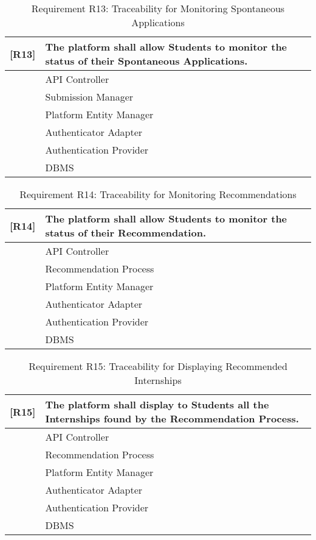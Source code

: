 \begin{table}[H]
    \centering
    \begin{tabular}{|p{1cm}|p{14cm}|}
    \hline
    \textbf{[R13]} & \textbf{The platform shall allow Students to monitor the status of their Spontaneous Applications.} \\ \hline
    [C1] & API Controller \\ \hline
    [C5] & Submission Manager \\ \hline
    [C10] & Platform Entity Manager \\ \hline
    [C11] & Authenticator Adapter \\ \hline
    [E3] & Authentication Provider \\ \hline
    [E4] & DBMS \\ \hline
    \end{tabular}
    \caption{Requirement R13: Traceability for Monitoring Spontaneous Applications}
    \label{tab:RT13}
\end{table}

\begin{table}[H]
    \centering
    \begin{tabular}{|p{1cm}|p{14cm}|}
    \hline
    \textbf{[R14]} & \textbf{The platform shall allow Students to monitor the status of their Recommendation.} \\ \hline
    [C1] & API Controller \\ \hline
    [C4] & Recommendation Process \\ \hline
    [C10] & Platform Entity Manager \\ \hline
    [C11] & Authenticator Adapter \\ \hline
    [E3] & Authentication Provider \\ \hline
    [E4] & DBMS \\ \hline
    \end{tabular}
    \caption{Requirement R14: Traceability for Monitoring Recommendations}
    \label{tab:RT14}
\end{table}

\begin{table}[H]
    \centering
    \begin{tabular}{|p{1cm}|p{14cm}|}
    \hline
    \textbf{[R15]} & \textbf{The platform shall display to Students all the Internships found by the Recommendation Process.} \\ \hline
    [C1] & API Controller \\ \hline
    [C4] & Recommendation Process \\ \hline
    [C10] & Platform Entity Manager \\ \hline
    [C11] & Authenticator Adapter \\ \hline
    [E3] & Authentication Provider \\ \hline
    [E4] & DBMS \\ \hline
    \end{tabular}
    \caption{Requirement R15: Traceability for Displaying Recommended Internships}
    \label{tab:RT15}
\end{table}

